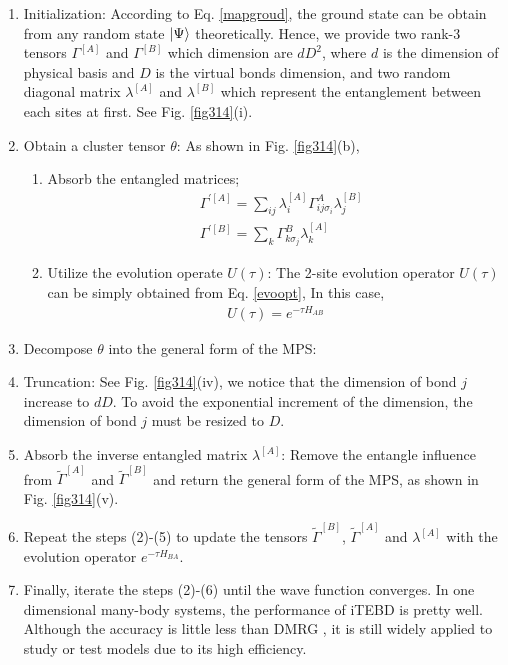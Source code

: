 \begin{enumerate}
		\item Initialization: According to Eq. \ref{mapgroud}, the ground state can be obtain from any random state $\Ket{\Psi}$ theoretically. Hence, we provide two rank-3 tensors $\Gamma^{[A]}$ and $\Gamma^{[B]}$ which dimension are $dD^2$, where $d$ is the dimension of physical basis and $D$ is the virtual bonds dimension, and two random diagonal matrix $\lambda^{[A]}$ and $\lambda^{[B]}$ which represent the entanglement between each sites at first. See Fig. \ref{fig314}(i).
		\item Obtain a cluster tensor $\theta$: As shown in Fig. \ref{fig314}(b),
			\begin{enumerate}
				\item Absorb the entangled matrices; 
					\begin{align}
						&\Gamma^{\prime [A]} = \sum_{ij}{\lambda^{[A]}_{i} \Gamma^{A}_{ij \sigma_i} \lambda^{[B]}_{j}} \\
						&\Gamma^{\prime [B]} = \sum_{k}{\Gamma^{B}_{k \sigma_j} \lambda^{[A]}_{k}}
					\end{align}
						\item Utilize the evolution operate $U(\tau)$: The 2-site evolution operator $U(\tau)$ can be simply obtained from Eq. \ref{evoopt}, In this case, 
							\begin{align}
								U(\tau) = e^{-\tau H_{AB}}
							\end{align}
			\end{enumerate}
		\item Decompose $\theta$ into the general form of the MPS:
		\item Truncation: See Fig. \ref{fig314}(iv), we notice that the dimension of bond $j$ increase to $dD$. To avoid the exponential increment of the dimension, the dimension of bond $j$ must be resized to $D$.
		\item Absorb the inverse entangled matrix $\lambda^{[A]}$: Remove the entangle influence from $\widetilde{\Gamma}^{[A]}$ and $\widetilde{\Gamma}^{[B]}$ and return the general form of the MPS, as shown in Fig. \ref{fig314}(v).
		\item Repeat the steps (2)-(5) to update the tensors $\widetilde{\Gamma}^{[B]}$, $\widetilde{\Gamma}^{[A]}$ and $\lambda^{[A]}$ with the evolution operator $e^{-\tau H_{BA}}$.
		\item Finally, iterate the steps (2)-(6) until the wave function converges.
In one dimensional many-body systems, the performance of iTEBD is pretty well. Although the accuracy is little less than DMRG \cite{}, it is still widely applied to study or test models due to its high efficiency.
\end{enumerate}

